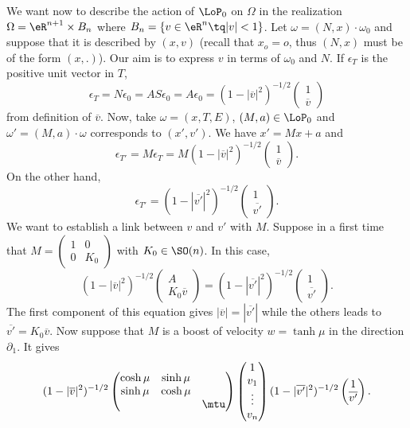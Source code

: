 We want now to describe the action of $\LoP_0$ on $\Omega$ in the realization $\Omega=\eR^{n+1}\times B_n$ where $B_n=\{ v\in\eR^n\tq | v |<1 \}$. Let $\omega=(N,x)\cdot \omega_0$ and suppose that it is described by $(x,v)$ (recall that $x_o=o$, thus $(N,x)$ must be of the form $(x,.)$). Our aim is to express $v$ in terms of $\omega_0$ and $N$. If $\epsilon_T$ is the positive unit vector in $T$,
\begin{equation} \label{eq_epsTv}
  \epsilon_T=N\epsilon_0=AS\epsilon_0=A\epsilon_0=
(1-|\overline{v}|^2)^{-1/2}
\begin{pmatrix}
1\\\overline{v}
\end{pmatrix}
\end{equation}
from definition of $\overline{v}$. Now, take $\omega=(x,T,E)$, $(M,a)\in\LoP_0$ and $\omega'=(M,a)\cdot \omega$ corresponds to $(x',v')$. We have $x'=Mx+a$ and
\[
  \epsilon_{T'}=M\epsilon_T=M(1-|\overline{v}|^2)^{-1/2}
\begin{pmatrix}
1\\\overline{v}
\end{pmatrix}.
\]
On the other hand,
\[
  \epsilon_{T'}=(1-|\overline{v'}|^2)^{-1/2}
\begin{pmatrix}
1\\\overline{v'}
\end{pmatrix}.
\]
We want to establish a link between $v$ and $v'$ with $M$. Suppose in a first time that
$
M=
\begin{pmatrix}
1&0\\0&K_0
\end{pmatrix}
$ with $K_0\in \SO(n)$. In this case,
\[
  (1-|\overline{v}|^2)^{-1/2}
\begin{pmatrix}
A\\K_0\overline{v}
\end{pmatrix}
=(1-|\overline{v'}|^2)^{-1/2}
\begin{pmatrix}
1\\\overline{v'}
\end{pmatrix}.
\]
The first component of this equation gives $| \overline{v} |=| \overline{v'} |$ while the others leads to $\overline{v'}=K_0\overline{v}$. Now suppose that $M$ is a boost of velocity $w=\tanh\mu$ in the direction $\partial_1$. It gives
\begin{equation} \label{eq_sysumv2}
  (1-|\overline{v}|^2)^{-1/2}
\begin{pmatrix}
  \cosh\mu&\sinh\mu\\
\sinh\mu&\cosh\mu\\
&&\mtu
\end{pmatrix}
\begin{pmatrix}
  1\\v_1\\\vdots\\v_n
\end{pmatrix}
(1-|\overline{v'}|^2)^{-1/2}
\begin{pmatrix}
1\\\overline{v'}
\end{pmatrix}.
\end{equation}
